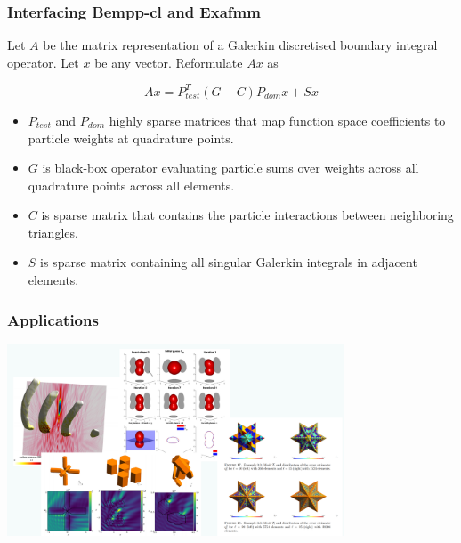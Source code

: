 \documentclass[dvipsnames,10pt]{beamer}
\begin{document}
\begin{frame}
	\frametitle{Interfacing Bempp-cl and Exafmm}
	
	Let $A$ be the matrix representation of a Galerkin discretised boundary integral operator.
	Let $x$ be any vector. Reformulate $Ax$ as
	
	$$
	Ax = P_{test}^T(G - C)P_{dom}x + Sx
	$$
	
	\begin{itemize}
		\item $P_{test}$ and $P_{dom}$ highly sparse matrices that map function space coefficients to particle weights at quadrature points.    \item $G$ is black-box operator evaluating particle sums over weights across all quadrature points across all elements.
		\item $C$ is sparse matrix that contains the particle interactions between neighboring triangles.
		\item $S$ is sparse matrix containing all singular Galerkin integrals in adjacent elements.
	\end{itemize}
	
\end{frame}

\begin{frame}
	\frametitle{Applications}
	
	\begin{center}
		\includegraphics[width=10cm]{../figs/applications}
	\end{center}
	
	
\end{frame}
\end{document}
